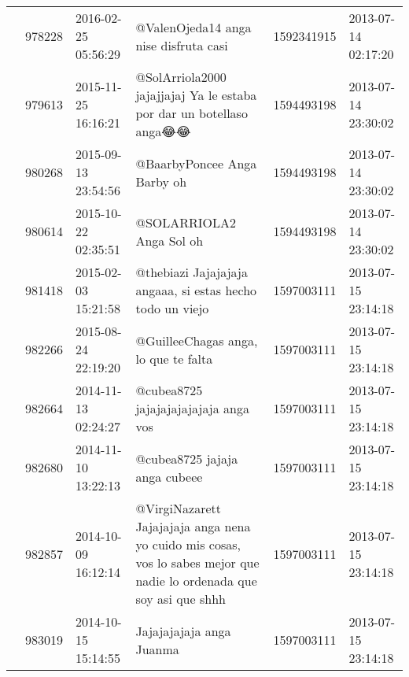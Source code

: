 \begin{tabular}{llllrl}
           & 978228  & 2016-02-25 05:56:29 &                                                                                                     @ValenOjeda14  anga  nise  disfruta casi &  1592341915 & 2013-07-14 02:17:20 \\
           & 979613  & 2015-11-25 16:16:21 &                                                                          @SolArriola2000 jajajjajaj Ya le estaba por dar un botellaso anga😂😂 &  1594493198 & 2013-07-14 23:30:02 \\
           & 980268  & 2015-09-13 23:54:56 &                                                                                                                  @BaarbyPoncee Anga Barby oh &  1594493198 & 2013-07-14 23:30:02 \\
           & 980614  & 2015-10-22 02:35:51 &                                                                                                                     @SOLARRIOLA2 Anga Sol oh &  1594493198 & 2013-07-14 23:30:02 \\
           & 981418  & 2015-02-03 15:21:58 &                                                                                    @thebiazi Jajajajaja angaaa, si estas hecho todo un viejo &  1597003111 & 2013-07-15 23:14:18 \\
           & 982266  & 2015-08-24 22:19:20 &                                                                                                         @GuilleeChagas anga, lo que te falta &  1597003111 & 2013-07-15 23:14:18 \\
           & 982664  & 2014-11-13 02:24:27 &                                                                                                         @cubea8725 jajajajajajajaja anga vos &  1597003111 & 2013-07-15 23:14:18 \\
           & 982680  & 2014-11-10 13:22:13 &                                                                                                                @cubea8725 jajaja anga cubeee &  1597003111 & 2013-07-15 23:14:18 \\
           & 982857  & 2014-10-09 16:12:14 &                        @VirgiNazarett Jajajajaja anga nena yo cuido mis cosas, vos lo sabes mejor que nadie lo ordenada que soy asi que shhh &  1597003111 & 2013-07-15 23:14:18 \\
           & 983019  & 2014-10-15 15:14:55 &                                                                                                                     Jajajajajaja anga Juanma &  1597003111 & 2013-07-15 23:14:18 \\

\end{tabular}
